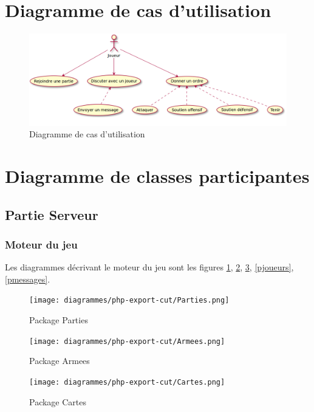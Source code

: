 \section{Diagramme de cas d'utilisation}
	\begin{figure}[!h]
		\centering
		\includegraphics[scale=0.4]{images/UseCase.png}
		\caption{Diagramme de cas d'utilisation}
	\end{figure}

\newpage

\section{Diagramme de classes participantes}
	\subsection{Partie Serveur}
		\subsubsection{Moteur du jeu}
        Les diagrammes décrivant le moteur du jeu sont les figures \ref{pparties}, \ref{parmees}, \ref{pcartes}, \ref{pjoueurs}, \ref{pmessages}.
			\begin{figure}[!h]
				\centering
                \texttt{[image: diagrammes/php-export-cut/Parties.png]}
                \caption{\label{pparties}Package Parties}
			\end{figure}

			\begin{figure}[!h]
				\centering
                \texttt{[image: diagrammes/php-export-cut/Armees.png]}
                \caption{\label{parmees}Package Armees}
			\end{figure}
            
			\begin{figure}[!h]
				\centering
                \texttt{[image: diagrammes/php-export-cut/Cartes.png]}
                \caption{\label{pcartes}Package Cartes}
			\end{figure}

